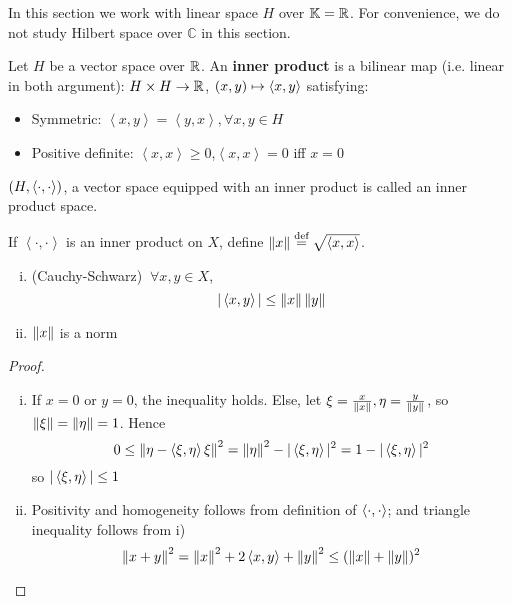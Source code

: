 \documentclass{article}
\begin{document}
In this section we work with linear space $H$ over $\mathbb{K} = \mathbb{R}$. For convenience, we do not study Hilbert space over $\mathbb{ C}$ in this section.


\begin{definition}
	Let $H$ be a vector space over $\mathbb{R}$. An {\bf inner product} is a bilinear map (i.e. linear in both argument):
	$H\times H\to\mathbb{R}$, $(x,y)\mapsto \left<{x},{y}\right>$ satisfying:
	\begin{itemize}
		\item Symmetric: $\left<x,y\right>={{\left<y,x\right>}},\forall x,y\in H$
		\item Positive definite: $\left<x,x\right>\geq0$,$\left<x,x\right>=0$ iff $x=0$
	\end{itemize}  
\end{definition}

\begin{definition}
    $(H,\left<{\cdot},{\cdot}\right>)$, a vector space equipped with an inner product is called an inner product space.
\end{definition}



\begin{theorem}
	If $\left<\cdot,\cdot\right>$ is an inner product on $X$, define $\left\|{x}\right\|\overset{\textrm{def}}{=}\sqrt{\left<{x},{x}\right>}$.
	\begin{enumerate}[i)]
		\item (Cauchy-Schwarz) $\ \forall x,y\in X$,
		      $$|\left<{x},{y}\right>|\leq \left\|{x}\right\| \left\|{y}\right\|$$
		\item $\left\|{x}\right\|$ is a norm
	\end{enumerate}
\end{theorem}

\begin{proof}
	\begin{enumerate}[i)]
		\item If $x=0$ or $y=0$, the inequality holds. Else, let $\xi = \frac{x}{\left\|{x}\right\|}, \eta = \frac{y}{\left\|{y}\right\|}$, so $\left\|{\xi}\right\|=\left\|{\eta}\right\|=1$. Hence
		      $$0 \leq \left\|{\eta-\left<{\xi},{\eta}\right>\xi}\right\|^2=\left\|{\eta}\right\|^2 - |\left<{\xi},{\eta}\right>|^2=1-|\left<{\xi},{\eta}\right>|^2$$
		      so $|\left<{\xi},{\eta}\right>| \leq 1$
		\item Positivity and homogeneity follows from definition of $\left<{\cdot},{\cdot}\right>$; and triangle inequality follows from i)
		      $$
			      \left\|{x+y}\right\|^2=\left\|{x}\right\|^2 + 2 \left<{x},{y}\right> + \left\|{y}\right\|^2 \leq (\left\|{x}\right\|+\left\|{y}\right\|)^2
		      $$
	\end{enumerate}
\end{proof}
\end{document}

